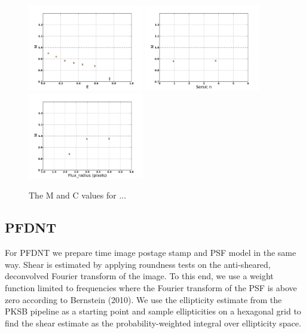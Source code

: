 \begin{figure}
\centering
\includegraphics[width=0.45\textwidth]{fig/MvaleMJ.pdf} 
\includegraphics[width=0.45\textwidth]{fig/Mval_typeMJ.pdf} 
\includegraphics[width=0.45\textwidth]{fig/Mval_sizeMJ.pdf} 
\caption{The M and C values for ...}
\label{fig:DEIMOS_m}
\end{figure}

\newpage 
\subsection{PFDNT}
For PFDNT we prepare time image postage stamp and PSF model in the
same way. Shear is estimated by applying roundness tests on the
anti-sheared, deconvolved Fourier transform of the image. To this end,
we use a weight function limited to frequencies where the Fourier
transform of the PSF is above zero according to Bernstein (2010). We
use the ellipticity estimate from the PKSB pipeline as a starting
point and sample ellipticities on a hexagonal grid to find the shear
estimate as the probability-weighted integral over ellipticity
space. \\

